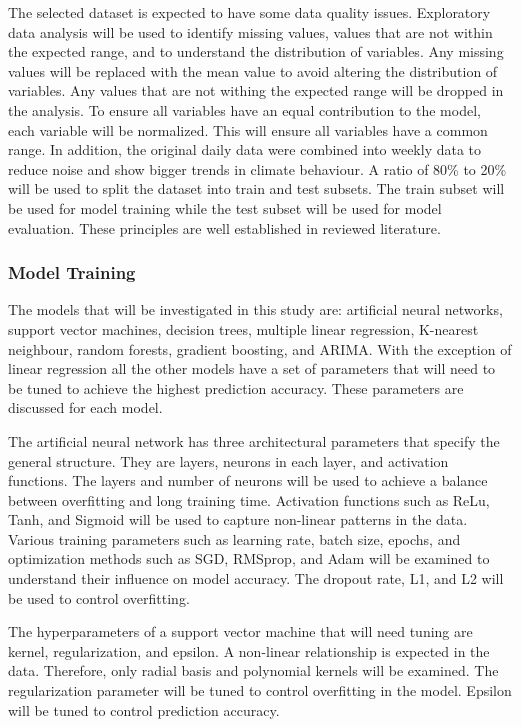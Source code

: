 \documentclass{article}
\begin{document}
The selected dataset is expected to have some data quality issues. Exploratory data analysis
will be used to identify missing values, values that are not within the expected range, and to
understand the distribution of variables. Any missing values will be replaced with the mean
value to avoid altering the distribution of variables. Any values that are not withing the
expected range will be dropped in the analysis. To ensure all variables have an equal
contribution to the model, each variable will be normalized. This will ensure all variables have
a common range. In addition, the original daily data were combined into weekly data to reduce
noise and show bigger trends in climate behaviour. A ratio of 80\% to 20\% will be used to split
the dataset into train and test subsets. The train subset will be used for model training while the
test subset will be used for model evaluation. These principles are well established in reviewed
literature.

\subsubsection{Model Training}

The models that will be investigated in this study are: artificial neural networks, support vector
machines, decision trees, multiple linear regression, K-nearest neighbour, random forests,
gradient boosting, and ARIMA. With the exception of linear regression all the other models
have a set of parameters that will need to be tuned to achieve the highest prediction accuracy.
These parameters are discussed for each model.

The artificial neural network has three architectural parameters that specify the general
structure. They are layers, neurons in each layer, and activation functions. The layers and
number of neurons will be used to achieve a balance between overfitting and long training time.
Activation functions such as ReLu, Tanh, and Sigmoid will be used to capture non-linear
patterns in the data. Various training parameters such as learning rate, batch size, epochs, and
optimization methods such as SGD, RMSprop, and Adam will be examined to understand their
influence on model accuracy. The dropout rate, L1, and L2 will be used to control overfitting.

The hyperparameters of a support vector machine that will need tuning are kernel,
regularization, and epsilon. A non-linear relationship is expected in the data. Therefore, only
radial basis and polynomial kernels will be examined. The regularization parameter will be
tuned to control overfitting in the model. Epsilon will be tuned to control prediction accuracy.
\end{document}
